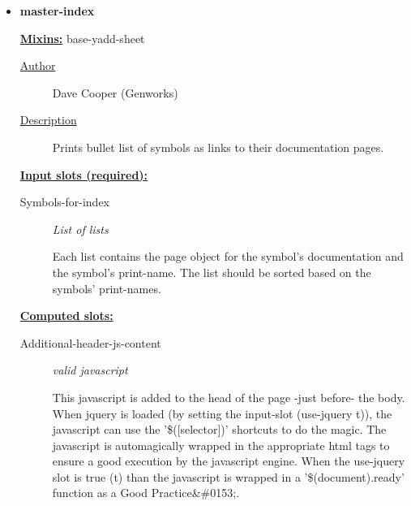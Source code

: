 \documentclass [11pt]{book}
\begin{document}
\begin{itemize}
\begin{description}
\end{description}







\item {}
\label{prim:master-index}
\textbf{master-index}


\textbf{
\underline{Mixins:}} base-yadd-sheet





\begin{description}

\item [
\underline{Author}]


Dave Cooper (Genworks)



\item [
\underline{Description}]


Prints bullet list of symbols as links to their documentation pages.



\end{description}








\textbf{
\underline{Input slots (required):}}

\begin{description}

\item [Symbols-for-index]
\emph{List of lists}

 Each list contains the page object for the symbol's
documentation and the symbol's print-name. The list should be sorted
based on the symbols' print-names.




\end{description}






\textbf{
\underline{Computed slots:}}

\begin{description}

\item [Additional-header-js-content]
\emph{valid javascript}

 This javascript is added to the head of the page -just before- the body.
When jquery is loaded (by setting the input-slot (use-jquery t)), the javascript can use the
'\$([selector])' shortcuts to do the magic. The javascript is automagically wrapped in the
appropriate html tags to ensure a good execution by the javascript engine. When the use-jquery
slot is true (t) than the javascript is wrapped in a '\$(document).ready' function as a
Good Practice&\#0153;.





\end{description}
\end{itemize}
\end{document}
